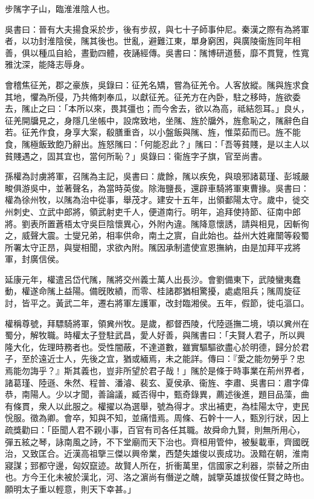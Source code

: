 
\begin{pinyinscope}
步隲字子山，臨淮淮陰人也。

吳書曰：晉有大夫揚食采於步，後有步叔，與七十子師事仲尼。秦漢之際有為將軍者，以功封淮陰侯，隲其後也。世亂，避難江東，單身窮困，與廣陵衞旌同年相善，俱以種瓜自給，晝勤四體，夜誦經傳。吳書曰：隲博研道藝，靡不貫覽，性寬雅沈深，能降志辱身。

會稽焦征羌，郡之豪族，吳錄曰：征羌名矯，嘗為征羌令。人客放縱。隲與旌求食其地，懼為所侵，乃共脩刺奉瓜，以獻征羌。征羌方在內卧，駐之移時，旌欲委去，隲止之曰：「本所以來，畏其彊也；而今舍去，欲以為高，祗結怨耳。」良乆，征羌開牖見之，身隱几坐帳中，設席致地，坐隲、旌於牖外，旌愈恥之，隲辭色自若。征羌作食，身享大案，殽膳重沓，以小盤飯與隲、旌，惟菜茹而已。旌不能食，隲極飯致飽乃辭出。旌怒隲曰：「何能忍此？」隲曰：「吾等貧賤，是以主人以貧賤遇之，固其宜也，當何所恥？」吳錄曰：衞旌字子旗，官至尚書。

孫權為討虜將軍，召隲為主記，吳書曰：歲餘，隲以疾免，與琅邪諸葛瑾、彭城嚴畯俱游吳中，並著聲名，為當時英俊。除海鹽長，還辟車騎將軍東曹掾。吳書曰：權為徐州牧，以隲為治中從事，舉茂才。建安十五年，出領鄱陽太守。歲中，徙交州刺史、立武中郎將，領武射吏千人，便道南行。明年，追拜使持節、征南中郎將。劉表所置蒼梧太守吳巨陰懷異心，外附內違。隲降意懷誘，請與相見，因斬徇之，威聲大震。士燮兄弟，相率供命，南土之賔，自此始也。益州大姓雍闓等殺蜀所署太守正昂，與燮相聞，求欲內附。隲因承制遣使宣恩撫納，由是加拜平戎將軍，封廣信侯。

延康元年，權遣呂岱代隲，隲將交州義士萬人出長沙。會劉備東下，武陵蠻夷蠢動，權遂命隲上益陽。備旣敗績，而零、桂諸郡猶相驚擾，處處阻兵；隲周旋征討，皆平之。黃武二年，遷右將軍左護軍，改封臨湘侯。五年，假節，徙屯漚口。

權稱尊號，拜驃騎將軍，領兾州牧。是歲，都督西陵，代陸遜撫二境，頃以兾州在蜀分，解牧職。時權太子登駐武昌，愛人好善，與隲書曰：「夫賢人君子，所以興隆大化，佐理時務者也。受性闇蔽，不達道數，雖實驅驅欲盡心於明德，歸分於君子，至於遠近士人，先後之宜，猶或緬焉，未之能詳。傳曰：『愛之能勿勞乎？忠焉能勿誨乎？』斯其義也，豈非所望於君子哉！」隲於是條于時事業在荊州界者，諸葛瑾、陸遜、朱然、程普、潘濬、裴玄、夏侯承、衞旌、李肅、吳書曰：肅字偉恭，南陽人。少以才聞，善論議，臧否得中，甄奇錄異，薦述後進，題目品藻，曲有條貫，衆人以此服之。權擢以為選舉，號為得才。求出補吏，為桂陽太守，吏民恱服。徵為卿。會卒，知與不知，並痛惜焉。周條、石幹十一人，甄別行狀，因上疏獎勸曰：「臣聞人君不親小事，百官有司各任其職。故舜命九賢，則無所用心，彈五絃之琴，詠南風之詩，不下堂廟而天下治也。齊桓用管仲，被髮載車，齊國旣治，又致匡合。近漢高祖擥三傑以興帝業，西楚失雄俊以喪成功。汲黯在朝，淮南寢謀；郅都守邊，匈奴竄迹。故賢人所在，折衝萬里，信國家之利器，崇替之所由也。方今王化未被於漢北，河、洛之濵尚有僭逆之醜，誠擥英雄拔俊任賢之時也。願明太子重以輕意，則天下幸甚。」


\end{pinyinscope}
